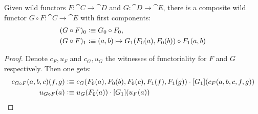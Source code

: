 \documentclass[english,a4paper]{lmcs}
\begin{document}
\begin{prop}
  Given wild functors $F:\cat C \to \cat D$ and $G:\cat D \to \cat E$, there is a composite wild functor $G\circ F :\cat C \to \cat E$ with first components:
  \begin{align*}
    (G\circ F)_0 &\vcentcolon\equiv G_0\circ F_0, \\
    (G\circ F)_1 &\vcentcolon\equiv (a,b) \mapsto G_1(F_0(a),F_0(b)) \circ F_1(a,b)
  \end{align*}
  \label{prop:composition-wild-functors}
\end{prop}
\begin{proof}
  Denote $c_F, u_F$ and $c_G,u_G$ the witnesses of functoriality for $F$ and
  $G$ respectively. Then one gets:
  \begin{align*}
    c_{G\circ F}(a,b,c)(f,g) &\vcentcolon\equiv c_G(F_0(a),F_0(b),F_0(c),F_1(f),F_1(g)) \cdot \mathop{\left[{G_1}\right]} ( c_F(a,b,c,f,g) ) \\
    u_{G\circ F}(a) &\vcentcolon\equiv u_G(F_0(a)) \cdot \mathop{\left[{G_1}\right]} (u_F(a))\qedhere
  \end{align*}
\end{proof}
\end{document}
